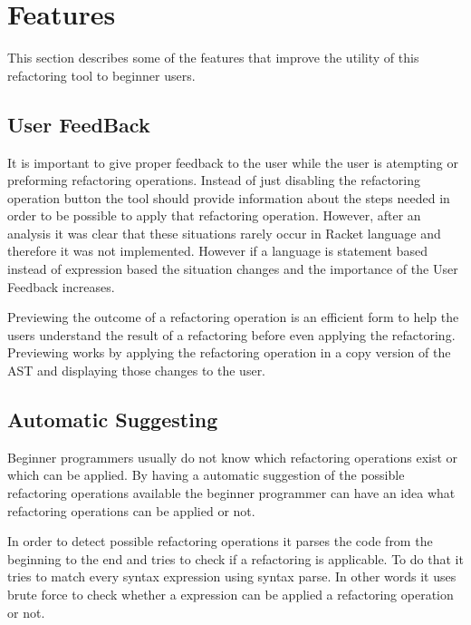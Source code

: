 \section{Features}
This section describes some of the features that improve the utility of this
refactoring tool to beginner users. %
\subsection{User FeedBack}
It is important to give proper feedback to the user while the user is atempting or
 preforming refactoring operations.
Instead of just disabling the refactoring operation button the tool should
 provide information about the steps needed in order to be possible to apply
 that refactoring operation.
However, after an analysis it was clear that these situations rarely occur
in Racket language and therefore it was not implemented.
However if a language is statement based instead of expression based the situation changes
and the importance of the User Feedback increases. %

Previewing the outcome of a refactoring operation is an efficient form to
help the users understand the result of a refactoring before even applying the refactoring. %
Previewing works by applying the refactoring operation in a copy version of the AST
and displaying those changes to the user.


\subsection{Automatic Suggesting}
Beginner programmers usually do not know which refactoring operations exist or
which can be applied.
By having a automatic suggestion of the possible refactoring operations available
 the beginner programmer can have an idea what refactoring operations can be
 applied or not.

In order to detect possible refactoring operations it parses the code from the
beginning to the end and tries to check if a refactoring is applicable.
To do that it tries to match every syntax expression using syntax parse.
In other words it uses brute force to check whether a expression can be applied
a refactoring operation or not.

